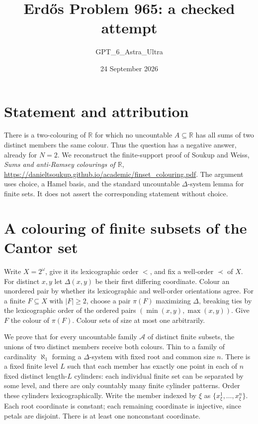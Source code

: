 \documentclass[11pt]{article}
\begin{document}
\title{Erd\H{o}s Problem 965: a checked attempt}
\author{GPT\_6\_Astra\_Ultra}
\date{24 September 2026}
\maketitle

\section*{Statement and attribution}
There is a two-colouring of $\mathbb R$ for which no uncountable $A\subseteq\mathbb R$ has all sums of two distinct members the same colour. Thus the question has a negative answer, already for $N=2$. We reconstruct the finite-support proof of Soukup and Weiss, \emph{Sums and anti-Ramsey colourings of $\mathbb R$}, \url{https://danieltsoukup.github.io/academic/finset_colouring.pdf}. The argument uses choice, a Hamel basis, and the standard uncountable $\Delta$-system lemma for finite sets. It does not assert the corresponding statement without choice.

\section*{A colouring of finite subsets of the Cantor set}
Write $X=2^\omega$, give it its lexicographic order $<$, and fix a well-order $\prec$ of $X$. For distinct $x,y$ let $\Delta(x,y)$ be their first differing coordinate. Colour an unordered pair by whether its lexicographic and well-order orientations agree. For a finite $F\subseteq X$ with $|F|\ge2$, choose a pair $\pi(F)$ maximizing $\Delta$, breaking ties by the lexicographic order of the ordered pairs $(\min(x,y),\max(x,y))$. Give $F$ the colour of $\pi(F)$. Colour sets of size at most one arbitrarily.

We prove that for every uncountable family $\mathcal A$ of distinct finite subsets, the unions of two distinct members receive both colours. Thin to a family of cardinality $\aleph_1$ forming a $\Delta$-system with fixed root and common size $n$. There is a fixed finite level $L$ such that each member has exactly one point in each of $n$ fixed distinct length-$L$ cylinders: each individual finite set can be separated by some level, and there are only countably many finite cylinder patterns. Order these cylinders lexicographically. Write the member indexed by $\xi$ as $\{x^1_\xi,\ldots,x^n_\xi\}$. Each root coordinate is constant; each remaining coordinate is injective, since petals are disjoint. There is at least one nonconstant coordinate.
\end{document}
